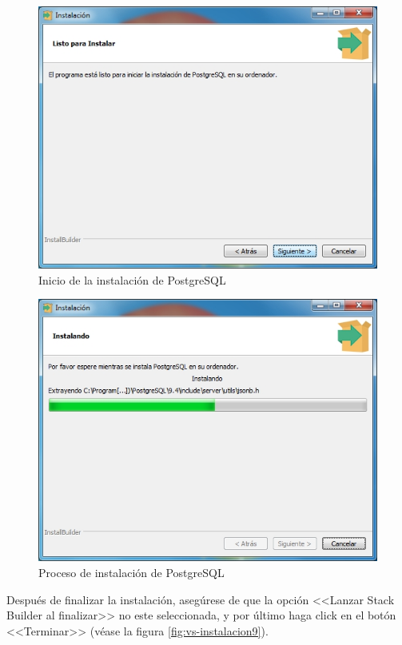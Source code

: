 \begin{figure}[H]
  \centering
  \includegraphics[width=.7\linewidth]{./img/postgres7.jpg}
\caption[]{Inicio de la instalaci\'{o}n de PostgreSQL\label{fig:postgres7}}
\end{figure}

\begin{figure}[H]
  \centering
  \includegraphics[width=.7\linewidth]{./img/postgres8.jpg}
\caption[]{Proceso de instalaci\'{o}n de PostgreSQL\label{fig:postgres8}}
\end{figure}

\newpage

Despu\'{e}s de finalizar la instalaci\'{o}n, aseg\'{u}rese de que la opci\'{o}n <<Lanzar Stack Builder al finalizar>> no este seleccionada, y por \'{u}ltimo haga click en el bot\'{o}n <<Terminar>> (v\'{e}ase la figura \ref{fig:vs-instalacion9}).	

